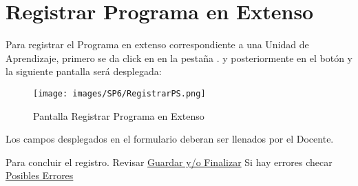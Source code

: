 \section{Registrar Programa en Extenso}

Para registrar el Programa en extenso correspondiente a una Unidad de Aprendizaje, primero se da click en en la pestaña . y posteriormente en el botón  y la siguiente pantalla será desplegada:

\begin{figure}[!h]
    \centering
    \hypertarget{9}{\texttt{[image: images/SP6/RegistrarPS.png]}}
    \caption{Pantalla Registrar Programa en Extenso}
\end{figure}

Los campos desplegados en el formulario deberan ser llenados por el Docente.

Para concluir el registro. Revisar \hyperlink{GuardarFinalizar}{Guardar y/o Finalizar}
Si hay errores checar \hyperlink{Errores}{Posibles Errores}